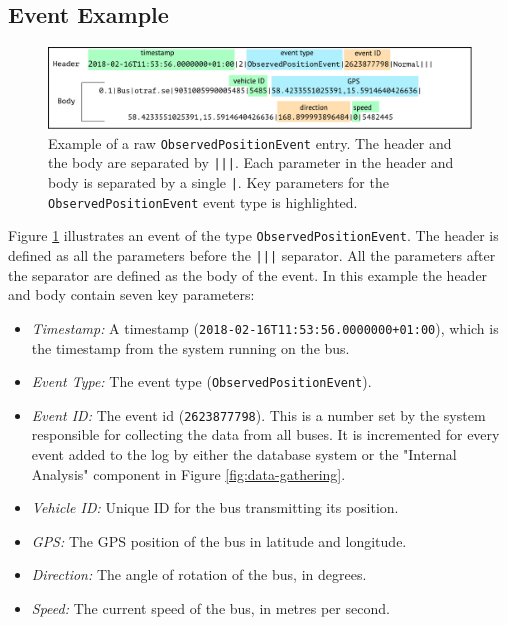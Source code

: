 \subsection{Event Example}

\begin{figure}[ht!]
    \centering
    \includegraphics[width=\textwidth]{figures/data-example-1}
    \caption{Example of a raw \texttt{ObservedPositionEvent} entry.
    The header and the body are separated by \texttt{|||}.
    Each parameter in the header and body is separated by a single \texttt{|}.
    Key parameters for the \texttt{ObservedPositionEvent} event type is highlighted.}
    \label{fig:data-ex-1}
\end{figure}

Figure \ref{fig:data-ex-1} illustrates an event of the type \texttt{ObservedPositionEvent}.
The header is defined as all the parameters before the \texttt{|||} separator.
All the parameters after the separator are defined as the body of the event.
In this example the header and body contain seven key parameters: 
\begin{itemize}
    \item \textit{Timestamp:} A timestamp (\texttt{2018-02-16T11:53:56.0000000+01:00}), which is the timestamp from the system running on the bus.
    \item \textit{Event Type:} The event type (\texttt{ObservedPositionEvent}).
    \item \textit{Event ID:} The event id (\texttt{2623877798}). This is a number set by the system responsible for collecting the data from all buses.
    It is incremented for every event added to the log by either the database system or the "Internal Analysis" component in Figure \ref{fig:data-gathering}.
    \item \textit{Vehicle ID:} Unique ID for the bus transmitting its position.
    \item \textit{GPS:} The GPS position of the bus in latitude and longitude.
    \item \textit{Direction:} The angle of rotation of the bus, in degrees.
    \item \textit{Speed:} The current speed of the bus, in metres per second.
\end{itemize}

